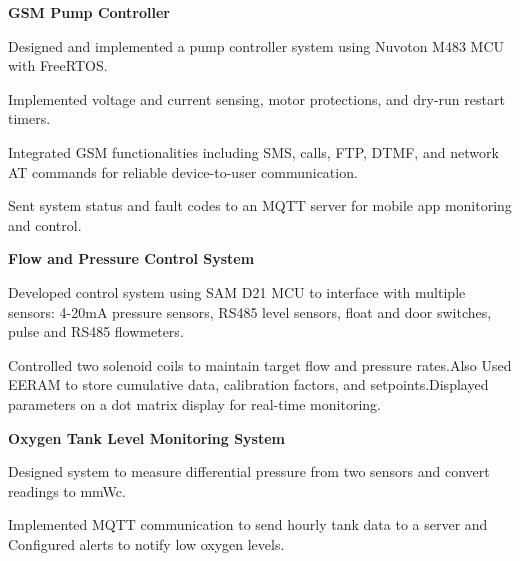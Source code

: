 

\begin{cventries}

\cventry
    {\textbf{GSM Pump Controller}} %
    {} %
    {} %
    {} %
    {
      \begin{cvitems}
        \item {Designed and implemented a pump controller system using Nuvoton M483 MCU with FreeRTOS.}
        \item {Implemented voltage and current sensing, motor protections, and dry-run restart timers.}
        \item {Integrated GSM functionalities including SMS, calls, FTP, DTMF, and network AT commands for reliable device-to-user communication.}
        \item {Sent system status and fault codes to an MQTT server for mobile app monitoring and control.}
      \end{cvitems}
    }

\cventry
    {\textbf{Flow and Pressure Control System}} 
    {} 
    {} 
    {} 
    {
      \begin{cvitems}
        \item {Developed control system using SAM D21 MCU to interface with multiple sensors: 4-20mA pressure sensors, RS485 level sensors, float and door switches, pulse and RS485 flowmeters.}
        \item {Controlled two solenoid coils to maintain target flow and pressure rates.Also Used EERAM to store cumulative data, calibration factors, and setpoints.Displayed parameters on a dot matrix display for real-time monitoring.}
      \end{cvitems}
    }

\cventry
    {\textbf{Oxygen Tank Level Monitoring System}} 
    {} 
    {} 
    {} 
    {
      \begin{cvitems}
        \item {Designed system to measure differential pressure from two sensors and convert readings to mmWc.}
        \item {Implemented MQTT communication to send hourly tank data to a server and Configured alerts to notify low oxygen levels.}
      \end{cvitems}
    }


\end{cventries}
